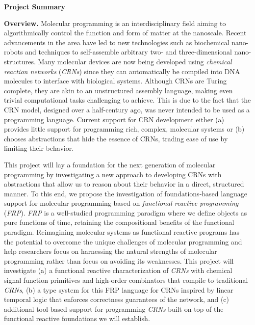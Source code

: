 \documentclass[11pt]{article}
\begin{document}
    \setcounter{page}{1}
    \begin{center}
        {\Large {\bf Project Summary}}
    \end{center}
    \vspace*{1em}

    \textbf{Overview.}
    Molecular programming is an interdisciplinary field aiming to algorithmically control the function and form of matter at the nanoscale.
    Recent advancements in the area have led to new technologies such as biochemical nano-robots and techniques to self-assemble arbitrary two- and three-dimensional nano-structures.
    Many molecular devices are now being developed using \emph{chemical reaction networks} (\emph{CRNs}) since they can automatically be compiled into DNA molecules to interface with biological systems.
    Although CRNs are Turing complete, they are akin to an unstructured assembly language, making even trivial computational tasks challenging to achieve.
    This is due to the fact that the CRN model, designed over a half-century ago, was never intended to be used as a programming language.
    Current support for CRN development either (a) provides little support for programming rich, complex, molecular systems or (b) chooses abstractions that hide the essence of CRNs, trading ease of use by limiting their behavior.

    This project will lay a foundation for the next generation of molecular programming by investigating a new approach to developing CRNs with abstractions that allow us to reason about their behavior in a direct, structured manner.
    To this end, we propose the investigation of foundations-based language support for molecular programming based on \emph{functional reactive programming} (\emph{FRP}).
    \emph{FRP} is a well-studied programming paradigm where we define objects as pure functions of time, retaining the compositional benefits of the functional paradigm. 
    Reimagining molecular systems as functional reactive programs has the potential to overcome the unique challenges of molecular programming and help researchers focus on harnessing the natural strengths of molecular programming rather than focus on avoiding its weaknesses.
    This project will investigate (a) a functional reactive characterization of \emph{CRNs} with chemical signal function primitives and high-order combinators that compile to traditional \emph{CRNs}, (b) a type system for this FRP language for CRNs inspired by linear temporal logic that enforces correctness guarantees of the network, and (c) additional tool-based support for programming \emph{CRNs} built on top of the functional reactive foundations we will establish.
\end{document}
